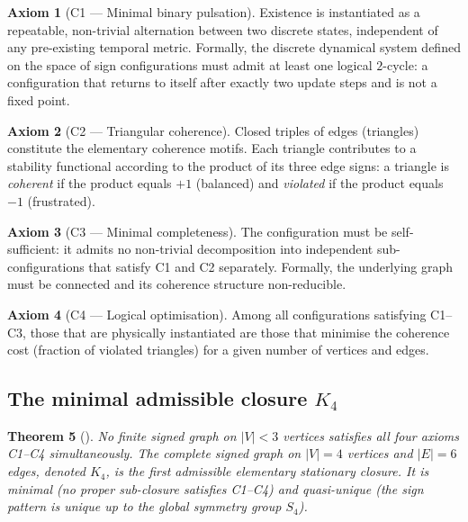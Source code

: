 \documentclass[11pt,a4paper]{article}
\theoremstyle{plain}
\newtheorem{theorem}{Theorem}[section]
\theoremstyle{definition}
\newtheorem{axiom}[theorem]{Axiom}
\theoremstyle{remark}
\newcommand{\Kfour}{K_4}
\begin{document}
\begin{axiom}[C1 --- Minimal binary pulsation]
Existence is instantiated as a repeatable, non-trivial alternation between two discrete states, independent of any pre-existing temporal metric. Formally, the discrete dynamical system defined on the space of sign configurations must admit at least one logical $2$-cycle: a configuration that returns to itself after exactly two update steps and is not a fixed point.
\end{axiom}

\begin{axiom}[C2 --- Triangular coherence]
Closed triples of edges (triangles) constitute the elementary coherence motifs. Each triangle contributes to a stability functional according to the product of its three edge signs: a triangle is \emph{coherent} if the product equals $+1$ (balanced) and \emph{violated} if the product equals $-1$ (frustrated).
\end{axiom}

\begin{axiom}[C3 --- Minimal completeness]
The configuration must be self-sufficient: it admits no non-trivial decomposition into independent sub-configurations that satisfy C1 and C2 separately. Formally, the underlying graph must be connected and its coherence structure non-reducible.
\end{axiom}

\begin{axiom}[C4 --- Logical optimisation]
Among all configurations satisfying C1--C3, those that are physically instantiated are those that minimise the coherence cost (fraction of violated triangles) for a given number of vertices and edges.
\end{axiom}

\subsection{The minimal admissible closure \texorpdfstring{$K_4$}{K4}}
\label{subsec:K4}
\begin{theorem}[\cite{D16a}]
\label{thm:K4}
No finite signed graph on $|V|<3$ vertices satisfies all four axioms C1--C4 simultaneously. The complete signed graph on $|V|=4$ vertices and $|E|=6$ edges, denoted $\Kfour$, is the first admissible elementary stationary closure. It is minimal (no proper sub-closure satisfies C1--C4) and quasi-unique (the sign pattern is unique up to the global symmetry group $S_4$).
\end{theorem}
\end{document}

